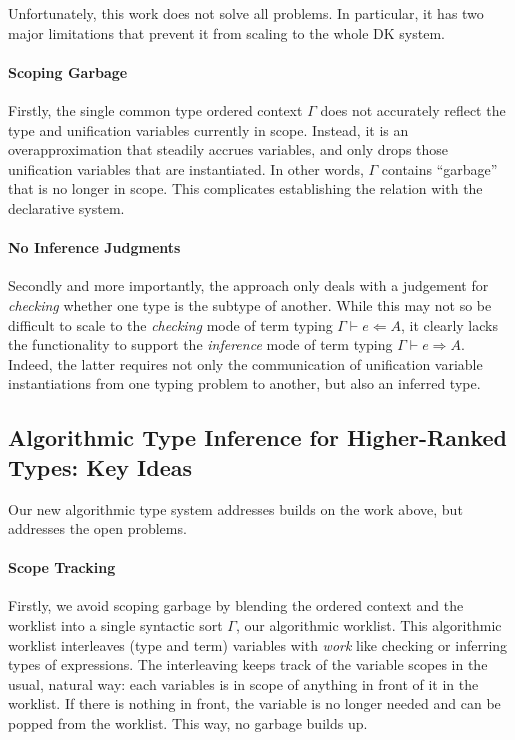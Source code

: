 Unfortunately, this work does not solve all problems. In particular, it has two
major limitations that prevent it from scaling to the whole DK system. 

\paragraph{Scoping Garbage} Firstly, the single common type ordered context 
$\Gamma$ does not accurately reflect the type and unification variables
currently in scope. Instead, it is an overapproximation that steadily accrues
variables, and only drops those unification variables that are instantiated.
In other words, $\Gamma$ contains ``garbage'' that is no longer in scope.
This complicates establishing the relation with the declarative system.


\paragraph{No Inference Judgments} 
Secondly and more importantly, the approach only deals with a judgement for
\emph{checking} whether one type is the subtype of another. While this may not
so be difficult to scale to the \emph{checking} mode of term typing $\Gamma
\vdash e \Leftarrow A$, it clearly lacks the functionality to support the
\emph{inference} mode of term typing $\Gamma \vdash e \Rightarrow A$. Indeed,
the latter requires not only the communication of unification variable
instantiations from one typing problem to another, but also an inferred type.

\subsection{Algorithmic Type Inference for Higher-Ranked Types: Key Ideas}

Our new algorithmic type system addresses builds on the work above, but
addresses the open problems. 

\paragraph{Scope Tracking}
Firstly, we avoid scoping garbage by blending the ordered context and the
worklist into a single syntactic sort $\Gamma$, our algorithmic worklist. This
algorithmic worklist interleaves (type and term) variables with \emph{work}
like checking or inferring types of expressions. The interleaving keeps track
of the variable scopes in the usual, natural way: each variables is in scope of
anything in front of it in the worklist. If there is nothing in front, the
variable is no longer needed and can be popped from the worklist. This way, no
garbage builds up.

